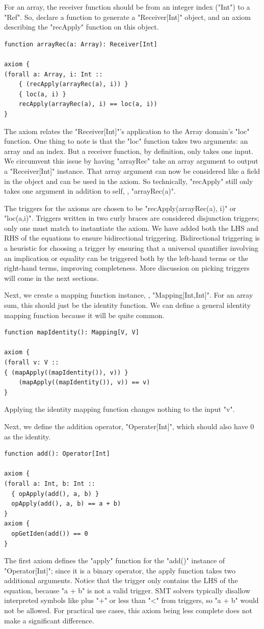 \documentclass[msc,oneside]{ubcthesis}
\theoremstyle{definition}
\begin{document}
For an array, the receiver function should be from an integer index ("Int") to a "Ref". So, declare a function to generate a "Receiver[Int]" object, and an axiom describing the "recApply" function on this object.
\begin{lstlisting}
function arrayRec(a: Array): Receiver[Int] 

axiom {
(forall a: Array, i: Int ::
    { (recApply(arrayRec(a), i)) }
    { loc(a, i) }
    recApply(arrayRec(a), i) == loc(a, i))
}
\end{lstlisting}
The axiom relates the "Receiver[Int]"'s application to the Array domain's "loc" function. One thing to note is that the "loc" function takes two arguments: an array and an index. But a receiver function, by definition, only takes one input. We circumvent this issue by having "arrayRec" take an array argument to output a "Receiver[Int]" instance. That array argument can now be considered like a field in the object and can be used in the axiom. So technically, "recApply" still only takes one argument in addition to self, \ie, "arrayRec(a)".

The triggers for the axioms are chosen to be "recApply(arrayRec(a), i)" or "loc(a,i)". Triggers written in two curly braces are considered disjunction triggers; only one must match to instantiate the axiom. We have added both the LHS and RHS of the equations to ensure bidirectional triggering. Bidirectional triggering is a heuristic for choosing a trigger by ensuring that a universal quantifier involving an implication or equality can be triggered both by the left-hand terms or the right-hand terms, improving completeness. More discussion on picking triggers will come in the next sections.

Next, we create a mapping function instance, \ie, "Mapping[Int,Int]". For an array sum, this should just be the identity function. We can define a general identity mapping function because it will be quite common.
\begin{lstlisting}
function mapIdentity(): Mapping[V, V] 
  
axiom {
(forall v: V ::
{ (mapApply((mapIdentity()), v)) }
    (mapApply((mapIdentity()), v)) == v)
}
\end{lstlisting}
Applying the identity mapping function changes nothing to the input "v".

Next, we define the addition operator, "Operater[Int]", which should also have 0 as the identity.
\begin{lstlisting}
function add(): Operator[Int] 
  
axiom {
(forall a: Int, b: Int ::
  { opApply(add(), a, b) }
  opApply(add(), a, b) == a + b)
}
axiom {
  opGetIden(add()) == 0
}
\end{lstlisting}
The first axiom defines the "apply" function for the "add()" instance of "Operator[Int]"; since it is a binary operator, the apply function takes two additional arguments. Notice that the trigger only contains the LHS of the equation, because "a + b" is not a valid trigger. SMT solvers typically disallow interpreted symbols like plus "+" or less than "<" from triggers, so "a + b" would not be allowed. For practical use cases, this axiom being less complete does not make a significant difference.
\end{document}
